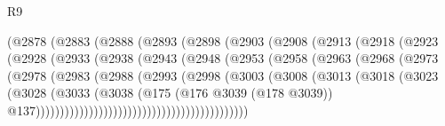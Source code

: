 \begin{lexlean}{R9}
\begin{coremodule}
{{{{{{{{{{{{{{{{{{{{{{{{{{{{{{{{{{{{{{{{{{{{{{{{{{{{{{{{{{{{{{{{{{{{{{{{{{{{{{{{{{{{{{{{{{{{{{{{{{{{{{{{{{{{                        (@2878
                          (@2883
                            (@2888
                              (@2893
                                (@2898
                                  (@2903
                                    (@2908
                                      (@2913
                                        (@2918
                                          (@2923
                                            (@2928
                                              (@2933
                                                (@2938
                                                  (@2943
                                                    (@2948
                                                      (@2953
                                                        (@2958
                                                          (@2963
                                                            (@2968
                                                              (@2973
                                                                (@2978
                                                                  (@2983
                                                                    (@2988
                                                                      (@2993
                                                                        (@2998
                                                                          (@3003
                                                                            (@3008
                                                                              (@3013
                                                                                (@3018
                                                                                  (@3023
                                                                                    (@3028
                                                                                      (@3033
                                                                                        (@3038
                                                                                          (@175
                                                                                            (@176
                                                                                              @3039
                                                                                              (@178
                                                                                                @3039))
                                                                                            @137))))))))))))))))))))))))))))))))))))))))))))
}}}}}}}}}}}}}}}}}}}}}}}}}}}}}}}}}}}}}}}}}}}}}}}}}}}}}}}}}}}}}}}}}}}}}}}}}}}}}}}}}}}}}}}}}}}}}}}}}}}}}}}}}}}}
\end{coremodule}
\end{lexlean}
